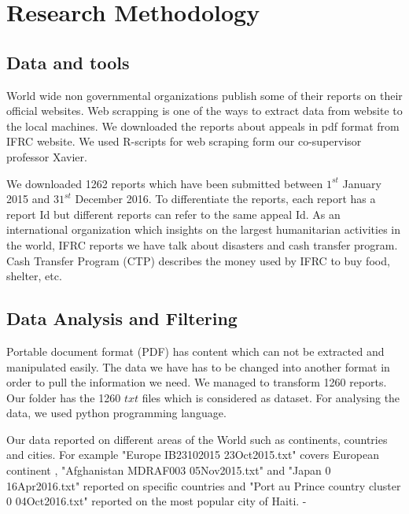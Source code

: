 \chapter{Research Methodology}
\section{Data and tools}
World wide non governmental organizations publish some of their reports on their official websites.  Web scrapping is one of the ways to extract data from website to the local machines. We downloaded the reports about appeals in pdf format from IFRC website. 
 We used R-scripts for web scraping form our co-supervisor professor Xavier. 
 
 
We downloaded 1262 reports which have been submitted between $ 1^{st}$ January 2015 and $31^{st}$ December 2016. To differentiate the reports, each report has  a report Id but different reports can refer to the same appeal Id.
As an international organization which insights on the largest humanitarian  activities in the world, IFRC reports we have talk about disasters and cash transfer program.
Cash Transfer Program (CTP) describes the money used by IFRC to buy food, shelter, etc.
\section{Data Analysis and Filtering}
Portable document format (PDF) has content which can not be extracted and manipulated  easily. The data we have has to be changed into another format in order to pull the information we need. We managed to transform 1260 reports.  Our folder has the 1260 $ txt $ files which is considered as dataset. For analysing the data, we used  python programming language.

Our data reported on different areas of the World such as continents, countries and cities. For example "Europe IB23102015 23Oct2015.txt" covers European continent , "Afghanistan MDRAF003 05Nov2015.txt" and  "Japan 0 16Apr2016.txt" reported  on specific countries and  "Port au Prince country cluster 0 04Oct2016.txt" reported on the most popular city of Haiti.
-
